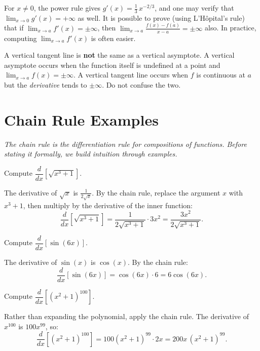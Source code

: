 \begin{remark}
For $x \neq 0$, the power rule gives $g'(x) = \frac{1}{3}\,x^{-2/3}$, and one may verify that $\lim_{x \to 0} g'(x) = +\infty$ as well.  It is possible to prove (using L'H\^opital's rule) that if $\lim_{x \to a} f'(x) = \pm\infty$, then $\lim_{x \to a}\frac{f(x)-f(a)}{x-a} = \pm\infty$ also.  In practice, computing $\lim_{x \to a} f'(x)$ is often easier.
\end{remark}

\begin{remark}[Warning]
A vertical tangent line is \textbf{not} the same as a vertical asymptote.  A vertical asymptote occurs when the function itself is undefined at a point and $\lim_{x \to a} f(x) = \pm\infty$.  A vertical tangent line occurs when $f$ is continuous at $a$ but the \emph{derivative} tends to $\pm\infty$.  Do not confuse the two.
\end{remark}

\section{Chain Rule Examples}
\label{sec:3.10}

\textit{The chain rule is the differentiation rule for compositions of functions.  Before stating it formally, we build intuition through examples.}

\begin{example}
\label{ex:3-9}
Compute $\dfrac{d}{dx}\!\left[\sqrt{x^{3}+1}\right]$.

The derivative of $\sqrt{x}$ is $\frac{1}{2\sqrt{x}}$.  By the chain rule, replace the argument $x$ with $x^{3}+1$, then multiply by the derivative of the inner function:
\[
  \dfrac{d}{dx}\!\left[\sqrt{x^{3}+1}\right]
  = \dfrac{1}{2\sqrt{x^{3}+1}} \cdot 3x^{2}
  = \dfrac{3x^{2}}{2\sqrt{x^{3}+1}}.
\]
\end{example}

\begin{example}
\label{ex:3-10}
Compute $\dfrac{d}{dx}\!\left[\sin(6x)\right]$.

The derivative of $\sin(x)$ is $\cos(x)$.  By the chain rule:
\[
  \dfrac{d}{dx}\!\left[\sin(6x)\right] = \cos(6x) \cdot 6 = 6\cos(6x).
\]
\end{example}

\begin{example}
\label{ex:3-11}
Compute $\dfrac{d}{dx}\!\left[(x^{2}+1)^{100}\right]$.

Rather than expanding the polynomial, apply the chain rule.  The derivative of $x^{100}$ is $100x^{99}$, so:
\[
  \dfrac{d}{dx}\!\left[(x^{2}+1)^{100}\right]
  = 100(x^{2}+1)^{99} \cdot 2x
  = 200x\,(x^{2}+1)^{99}.
\]
\end{example}


